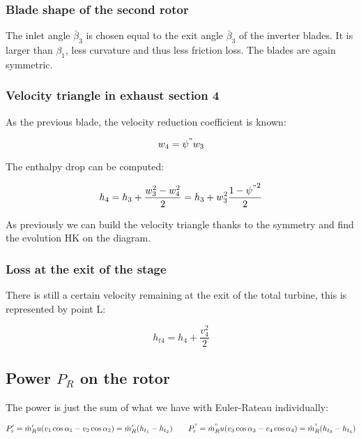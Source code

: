 \subsubsection{Blade shape of the second rotor}
The inlet angle $\bar{\beta}_3$ is chosen equal to the exit angle $\bar{\beta} _3$ of the inverter blades. It is larger than $\beta _1$, less curvature and thus less friction loss. The blades are again symmetric. 

\subsubsection{Velocity triangle in exhaust section 4}
As the previous blade, the velocity reduction coefficient is known: 

\begin{equation}
w_4 = \psi ^" w_3
\end{equation}

The enthalpy drop can be computed: 

\begin{equation}
h_4 = h_3 + \frac{w_3^2 - w_4^2}{2} = h_3 + w_3^2\frac{1 - {\psi ^"}^2}{2} 
\end{equation}

As previously we can build the velocity triangle thanks to the symmetry and find the evolution HK on the diagram. 

\subsubsection{Loss at the exit of the stage}
There is still a certain velocity remaining at the exit of the total turbine, this is represented by point L: 

\begin{equation}
h_{t4} = h_4 +  \frac{v_4^2}{2}
\end{equation}

\subsection{Power $P_R$ on the rotor}

The power is just the sum of what we have with Euler-Rateau individually: 

\begin{equation}
P'_r = \dot{m}'_R u (v_1 \cos \alpha _1 - v_2 \cos \alpha _2)= \dot{m}_R'(h_{t_1}-h_{t_2})\qquad P^"_r = \dot{m}^"_R u (v_3 \cos \alpha _3 - v_4 \cos \alpha _4) = \dot{m}_R^"(h_{t_3}-h_{t_4})
\end{equation}

